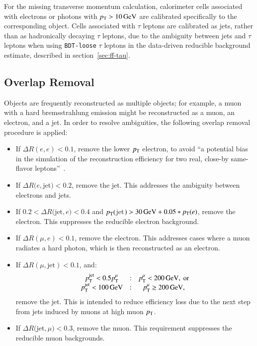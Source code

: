 For the missing transverse momentum calculation, calorimeter cells associated with electrons or photons with $p_{\text{T}}>\SI{10}{\giga\electronvolt}$ are calibrated specifically to the corresponding object. Cells associated with $\tau$ leptons are calibrated as jets, rather than as hadronically decaying $\tau$ leptons, due to the ambiguity between jets and $\tau$ leptons when using \texttt{BDT-loose} $\tau$ leptons in the data-driven reducible background estimate, described in section~\ref{sec:ff-tau}. 



\subsection{Overlap Removal}\label{sec:model-independent-overlap-removal}
Objects are frequently reconstructed as multiple objects; for example, a muon with a hard bremsstrahlung emission might be reconstructed as a muon, an electron, and a jet. In order to resolve ambiguities, the following overlap removal procedure is applied:

\begin{itemize}
	\item If $\Delta R(e, e) < 0.1$, remove the lower $p_{\text{T}}$ electron, to avoid ``a potential bias in the simulation of the reconstruction efficiency for two real, close-by same-flavor leptons''~\cite{Adams:2014wx}.
	\item If $\Delta R(e, $jet$) < 0.2$, remove the jet. This addresses the ambiguity between electrons and jets.
	\item If $0.2 < \Delta R($jet$, e) < 0.4$ and $p_{\text{T}}($jet$) > \SI{30}{\giga\electronvolt} + 0.05 * p_{\text{T}}(e)$, remove the electron. This suppresses the reducible electron background.
	\item If $\Delta R(\mu, e) < 0.1$, remove the electron. This addresses cases where a muon radiates a hard photon, which is then reconstructed as an electron.
	\item If $\Delta R(\mu, \mbox{jet})<0.1$, and:
	\begin{equation}
		\begin{array}{ccc}
			p_{\text{T}}^{\mathrm{jet}}<0.5 p_{\text{T}}^{\mu} & : & p_{\text{T}}^{\mu} < \SI{200}{\giga\electronvolt},\ \mbox{or} \\
			p_{\text{T}}^{\mathrm{jet}}<\SI{100}{\giga\electronvolt} & : & p_{\text{T}}^{\mu} \geq \SI{200}{\giga\electronvolt},
		\end{array}
	\end{equation}
	remove the jet. This is intended to reduce efficiency loss due to the next step from jets induced by muons at high muon $p_{\text{T}}$. 
	\item If $\Delta R($jet$, \mu) < 0.3$, remove the muon. This requirement suppresses the reducible muon backgrounds.
\end{itemize}

